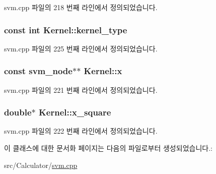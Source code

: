 svm.\+cpp 파일의 218 번째 라인에서 정의되었습니다.

\hypertarget{class_kernel_a01e78214a5c60876d71ee05fe97f4566}{
\subsubsection[{kernel\+\_\+type}]{\setlength{\rightskip}{0pt plus 5cm}const int Kernel\+::kernel\+\_\+type\hspace{0.3cm}{\ttfamily [private]}}}\label{class_kernel_a01e78214a5c60876d71ee05fe97f4566}


svm.\+cpp 파일의 225 번째 라인에서 정의되었습니다.

\hypertarget{class_kernel_a725a35660c4309605c2628fa8290ce5f}{
\subsubsection[{x}]{\setlength{\rightskip}{0pt plus 5cm}const {\bf svm\+\_\+node}$\ast$$\ast$ Kernel\+::x\hspace{0.3cm}{\ttfamily [private]}}}\label{class_kernel_a725a35660c4309605c2628fa8290ce5f}


svm.\+cpp 파일의 221 번째 라인에서 정의되었습니다.

\hypertarget{class_kernel_a97ca8abb41cd6ba8b1553738d59352d5}{
\subsubsection[{x\+\_\+square}]{\setlength{\rightskip}{0pt plus 5cm}double$\ast$ Kernel\+::x\+\_\+square\hspace{0.3cm}{\ttfamily [private]}}}\label{class_kernel_a97ca8abb41cd6ba8b1553738d59352d5}


svm.\+cpp 파일의 222 번째 라인에서 정의되었습니다.



이 클래스에 대한 문서화 페이지는 다음의 파일로부터 생성되었습니다.\+:\begin{DoxyCompactItemize}
\item 
src/\+Calculator/\hyperlink{svm_8cpp}{svm.\+cpp}\end{DoxyCompactItemize}
